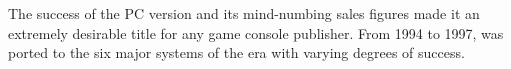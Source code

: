 The success of the PC version and its mind-numbing sales figures made it an extremely desirable title for any game console publisher. From 1994 to 1997, \doom{} was ported to the six major systems of the era with varying degrees of success.\\
\par


